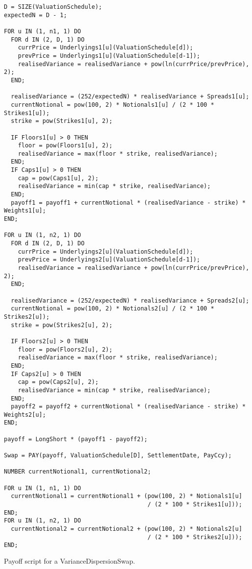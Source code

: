 \begin{listing}[hbt]
\begin{verbatim}
D = SIZE(ValuationSchedule);
expectedN = D - 1;

FOR u IN (1, n1, 1) DO
  FOR d IN (2, D, 1) DO
    currPrice = Underlyings1[u](ValuationSchedule[d]);
    prevPrice = Underlyings1[u](ValuationSchedule[d-1]);
    realisedVariance = realisedVariance + pow(ln(currPrice/prevPrice), 2);
  END;

  realisedVariance = (252/expectedN) * realisedVariance + Spreads1[u];
  currentNotional = pow(100, 2) * Notionals1[u] / (2 * 100 * Strikes1[u]);
  strike = pow(Strikes1[u], 2);

  IF Floors1[u] > 0 THEN
    floor = pow(Floors1[u], 2);
    realisedVariance = max(floor * strike, realisedVariance);
  END;
  IF Caps1[u] > 0 THEN
    cap = pow(Caps1[u], 2);
    realisedVariance = min(cap * strike, realisedVariance);
  END;
  payoff1 = payoff1 + currentNotional * (realisedVariance - strike) * Weights1[u];
END;

FOR u IN (1, n2, 1) DO
  FOR d IN (2, D, 1) DO
    currPrice = Underlyings2[u](ValuationSchedule[d]);
    prevPrice = Underlyings2[u](ValuationSchedule[d-1]);
    realisedVariance = realisedVariance + pow(ln(currPrice/prevPrice), 2);
  END;

  realisedVariance = (252/expectedN) * realisedVariance + Spreads2[u];
  currentNotional = pow(100, 2) * Notionals2[u] / (2 * 100 * Strikes2[u]);
  strike = pow(Strikes2[u], 2);

  IF Floors2[u] > 0 THEN
    floor = pow(Floors2[u], 2);
    realisedVariance = max(floor * strike, realisedVariance);
  END;
  IF Caps2[u] > 0 THEN
    cap = pow(Caps2[u], 2);
    realisedVariance = min(cap * strike, realisedVariance);
  END;
  payoff2 = payoff2 + currentNotional * (realisedVariance - strike) * Weights2[u];
END;

payoff = LongShort * (payoff1 - payoff2);

Swap = PAY(payoff, ValuationSchedule[D], SettlementDate, PayCcy);

NUMBER currentNotional1, currentNotional2;

FOR u IN (1, n1, 1) DO
  currentNotional1 = currentNotional1 + (pow(100, 2) * Notionals1[u]
                                         / (2 * 100 * Strikes1[u]));
END;
FOR u IN (1, n2, 1) DO
  currentNotional2 = currentNotional2 + (pow(100, 2) * Notionals2[u]
                                         / (2 * 100 * Strikes2[u]));
END;
\end{verbatim}
\caption{Payoff script for a VarianceDispersionSwap.}
\label{lst:variance_dispersion_swap}
\end{listing}

